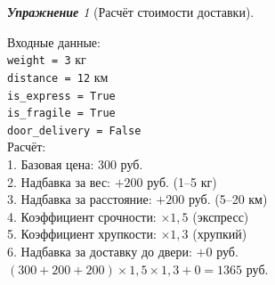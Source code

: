 \documentclass[a4paper,12pt]{article}
\theoremstyle{remark}
\newtheorem{exercise}{\textbf{Упражнение}}[section]
\begin{document}
\begin{exercise}[Расчёт стоимости доставки]
\begin{outputformat}[title=Пример 2]
    Входные данные: \\
    \texttt{weight = 3} кг \\
    \texttt{distance = 12} км \\
    \texttt{is\_express = True} \\
    \texttt{is\_fragile = True} \\
    \texttt{door\_delivery = False} \\[4pt]
    Расчёт: \\
    1. Базовая цена: 300 руб. \\
    2. Надбавка за вес: $+200$ руб. (1--5 кг) \\
    3. Надбавка за расстояние: $+200$ руб. (5--20 км) \\
    4. Коэффициент срочности: $\times 1{,}5$ (экспресс) \\
    5. Коэффициент хрупкости: $\times 1{,}3$ (хрупкий) \\
    6. Надбавка за доставку до двери: $+0$ руб. \\[4pt]
    $(300 + 200 + 200) \times 1{,}5 \times 1{,}3 + 0 = 1365$ руб.
\end{outputformat}

\end{exercise}
\end{document}
